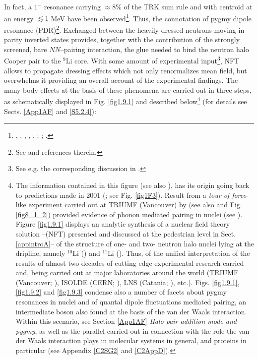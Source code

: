  In fact, a $1^-$ resonance carrying $\approx 8\%$ of the TRK sum rule and with centroid at an energy $\lesssim 1$ MeV have been observed\footnote{\label{f119C2} \cite{Zinser:97}, \cite{Nakamura:06}, \cite{Shimoura:95}, \cite{Ieki:93}, \cite{Sackett:93},  \cite{Kobayashi:89}; \cite{Kanungo:15}; \cite{Aumann:19}.}. Thus, the connotation of pygmy dipole  resonance (PDR)\footnote{See \cite{Broglia:19} and references therein.}. Exchanged between the heavily dressed neutrons moving in  parity inverted states provides, together with the contribution of the strongly screened, bare $NN$--pairing interaction, the glue needed to bind the neutron halo Cooper pair to the $^9$Li core. With some amount of experimental input\footnote{See e.g. the corresponding discussion in \cite{Barranco:17}.}, NFT allows to propagate dressing effects which not only renormalizes mean field, but overwhelms it providing an overall account of the experimental findings.
The many-body effects at the basis of these phenomena are carried out   in three steps, as schematically displayed in Fig. \ref{fig1.9.1} and described below\footnote{The information contained in this figure (see also \cite{Broglia:19b}), has its origin going back to predictions made in 2001 (\cite{Barranco:01}; see Fig. \ref{fig1F3}). Result from a \textit{tour of force}-like experiment carried out at TRIUMF (Vancouver) by \cite{Tanihata:08} (see also \cite{Tanihata:13} and Fig. \ref{fig8_1_2}) provided evidence of phonon mediated pairing in nuclei (see \cite{Potel:10}). Figure \ref{fig1.9.1} displays an analytic synthesis of a nuclear field theory solution --(NFT) presented and discussed at the pedestrian level in Sect. \ref{appintroA}-- of the structure of one- and two- neutron halo nuclei lying at the dripline, namely $^{10}$Li (\cite{Barranco:20}) and $^{11}$Li (\cite{Barranco:01}). Thus, of the unified interpretation of the results of almost two decades of cutting edge experimental research carried and, being carried out at major laboratories around the world (TRIUMF (Vancouver; \cite{Tanihata:08}), ISOLDE (CERN; \cite{Jeppesen:06}), LNS (Catania; \cite{Cavallaro:17}), etc.). Figs. \ref{fig1.9.1}, \ref{fig1.9.2} and \ref{fig1.9.3} condense also a number of facets about pygmy resonances in nuclei  and of quantal dipole fluctuations mediated pairing, an intermediate boson also found at the basis of the van der Waals interaction. Within this scenario, see  Section  \ref{App1AF} \textit{Halo pair addition mode and pygmy}, as well as the parallel carried out in connection with the role the van der Waals interaction plays in molecular systems in general, and proteins in particular (see Appendix \ref{C2SG2} and \ref{C2AppD}).
} (for details see Sects. \ref{App1AF} and \ref{S5.2.4}):


